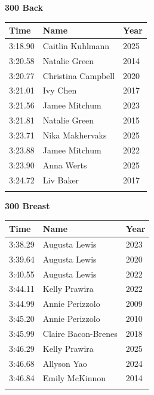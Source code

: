 \vspace{1.2em}
\noindent\begin{minipage}[t]{0.48\textwidth}
\centering
\textbf{\textcolor{teamprimary}{300 Back}}\par
\vspace{0.5em}
\centering
\small
\renewcommand{\arraystretch}{1.0}
\setlength{\tabcolsep}{4pt}
\begin{tabular}{@{}p{1.8cm}p{3.0cm}p{1.0cm}@{}}
\toprule
\textbf{Time} & \textbf{Name} & \textbf{Year} \\
\midrule
3:18.90 & Caitlin Kuhlmann & 2025 \\
3:20.58 & Natalie Green & 2014 \\
3:20.77 & Christina Campbell & 2020 \\
3:21.01 & Ivy Chen & 2017 \\
3:21.56 & Jamee Mitchum & 2023 \\
3:21.81 & Natalie Green & 2015 \\
3:23.71 & Nika Makhervaks & 2025 \\
3:23.88 & Jamee Mitchum & 2022 \\
3:23.90 & Anna Werts & 2025 \\
3:24.72 & Liv Baker & 2017 \\
\bottomrule
\vspace{0.5em}
\end{tabular}
\end{minipage}
\hfill
\begin{minipage}[t]{0.48\textwidth}
\centering
\textbf{\textcolor{teamprimary}{300 Breast}}\par
\vspace{0.5em}
\centering
\small
\renewcommand{\arraystretch}{1.0}
\setlength{\tabcolsep}{4pt}
\begin{tabular}{@{}p{1.8cm}p{3.0cm}p{1.0cm}@{}}
\toprule
\textbf{Time} & \textbf{Name} & \textbf{Year} \\
\midrule
3:38.29 & Augusta Lewis & 2023 \\
3:39.64 & Augusta Lewis & 2020 \\
3:40.55 & Augusta Lewis & 2022 \\
3:44.11 & Kelly Prawira & 2022 \\
3:44.99 & Annie Perizzolo & 2009 \\
3:45.20 & Annie Perizzolo & 2010 \\
3:45.99 & Claire Bacon-Brenes & 2018 \\
3:46.29 & Kelly Prawira & 2025 \\
3:46.68 & Allyson Yao & 2024 \\
3:46.84 & Emily McKinnon & 2014 \\
\bottomrule
\vspace{0.5em}
\end{tabular}
\end{minipage}
